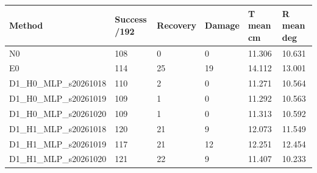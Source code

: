 \begin{tabular}{llllll}
\hline
Method & Success /192 & Recovery & Damage & T mean cm & R mean deg \\
\hline
N0 & 108 & 0 & 0 & 11.306 & 10.631 \\
E0 & 114 & 25 & 19 & 14.112 & 13.001 \\
D1\_H0\_MLP\_s20261018 & 110 & 2 & 0 & 11.271 & 10.564 \\
D1\_H0\_MLP\_s20261019 & 109 & 1 & 0 & 11.292 & 10.563 \\
D1\_H0\_MLP\_s20261020 & 109 & 1 & 0 & 11.313 & 10.592 \\
D1\_H1\_MLP\_s20261018 & 120 & 21 & 9 & 12.073 & 11.549 \\
D1\_H1\_MLP\_s20261019 & 117 & 21 & 12 & 12.251 & 12.454 \\
D1\_H1\_MLP\_s20261020 & 121 & 22 & 9 & 11.407 & 10.233 \\
\hline
\end{tabular}
